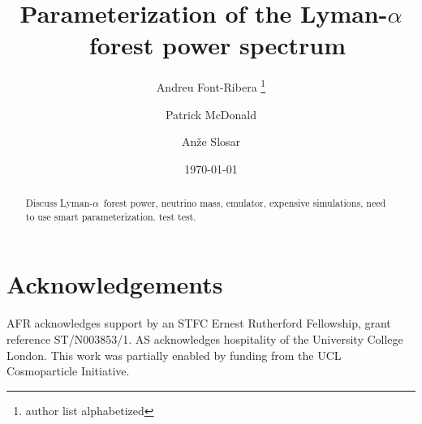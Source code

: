 \documentclass[preprintnumbers,prd,superscriptaddress,notitlepage,nofootinbib] {revtex4-1}
\newcommand{\lya}{Lyman-$\alpha$}
\begin{document}
\title{Parameterization of the \lya\ forest power spectrum}

\author{Andreu Font-Ribera \footnote{author list alphabetized}}
\author{Patrick McDonald}
\author{An\v{z}e Slosar}

\date{\today}

\begin{abstract}
Discuss \lya\ forest power, neutrino mass, emulator, expensive
simulations, need to use smart parameterization. test test.
\end{abstract}

\maketitle















\section*{Acknowledgements}
AFR acknowledges support by an STFC Ernest Rutherford Fellowship, grant reference ST/N003853/1.
AS acknowledges hospitality of the University College London.
This work was partially enabled by funding from the UCL Cosmoparticle
Initiative.




\end{document}
